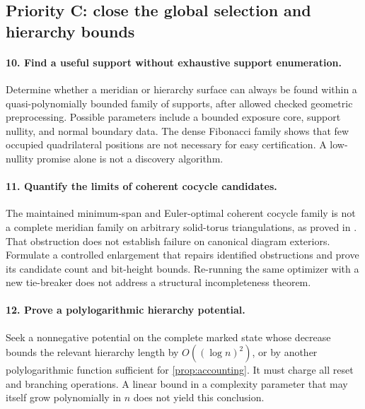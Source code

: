 \subsection{Priority C: close the global selection and hierarchy bounds}

\paragraph{10. Find a useful support without exhaustive support enumeration.}
Determine whether a meridian or hierarchy surface can always be found within
a quasi-polynomially bounded family of supports, after allowed checked
geometric preprocessing.  Possible parameters include a bounded exposure
core, support nullity, and normal boundary data.  The dense Fibonacci family
shows that few occupied quadrilateral positions are not necessary for easy
certification.  A low-nullity promise alone is not a discovery algorithm.

\paragraph{11. Quantify the limits of coherent cocycle candidates.}
The maintained minimum-span and Euler-optimal coherent cocycle family is not
a complete meridian family on arbitrary solid-torus triangulations, as proved
in .  That obstruction does not
establish failure on canonical diagram exteriors.  Formulate a controlled
enlargement that repairs identified obstructions and prove its candidate count
and bit-height bounds.  Re-running
the same optimizer with a new tie-breaker does not address a structural
incompleteness theorem.

\paragraph{12. Prove a polylogarithmic hierarchy potential.}
Seek a nonnegative potential on the complete marked state whose decrease
bounds the relevant hierarchy length by $O((\log n)^2)$, or by another
polylogarithmic function sufficient for \cref{prop:accounting}.  It must charge
all reset and branching operations.  A linear bound in a complexity parameter
that may itself grow polynomially in $n$ does not yield this conclusion.

